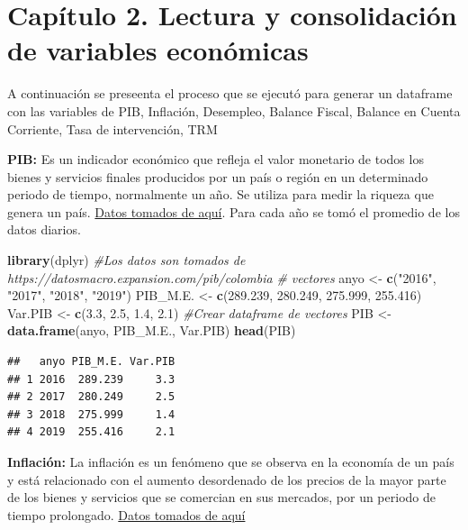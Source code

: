 \documentclass[
  11pt,
  a4paper,
]{book}
\newenvironment{Shaded}{\begin{snugshade}}{\end{snugshade}}
\newcommand{\CommentTok}[1]{\textcolor[rgb]{0.56,0.35,0.01}{\textit{#1}}}
\newcommand{\FloatTok}[1]{\textcolor[rgb]{0.00,0.00,0.81}{#1}}
\newcommand{\KeywordTok}[1]{\textcolor[rgb]{0.13,0.29,0.53}{\textbf{#1}}}
\newcommand{\NormalTok}[1]{#1}
\newcommand{\StringTok}[1]{\textcolor[rgb]{0.31,0.60,0.02}{#1}}
\begin{document}
\hypertarget{capuxedtulo-2.-lectura-y-consolidaciuxf3n-de-variables-econuxf3micas}{%
\chapter{Capítulo 2. Lectura y consolidación de variables
económicas}\label{capuxedtulo-2.-lectura-y-consolidaciuxf3n-de-variables-econuxf3micas}}

A continuación se preseenta el proceso que se ejecutó para generar un
dataframe con las variables de PIB, Inflación, Desempleo, Balance
Fiscal, Balance en Cuenta Corriente, Tasa de intervención, TRM

\textbf{PIB:} Es un indicador económico que refleja el valor monetario
de todos los bienes y servicios finales producidos por un país o región
en un determinado periodo de tiempo, normalmente un año. Se utiliza para
medir la riqueza que genera un país.
\href{https://datosmacro.expansion.com/pib/colombia}{Datos tomados de
aquí}. Para cada año se tomó el promedio de los datos diarios.

\begin{Shaded}
\begin{Highlighting}[]
\KeywordTok{library}\NormalTok{(dplyr)}
\CommentTok{#Los datos son tomados de https://datosmacro.expansion.com/pib/colombia}
\CommentTok{# vectores }
\NormalTok{anyo <-}\StringTok{ }\KeywordTok{c}\NormalTok{(}\StringTok{"2016"}\NormalTok{, }\StringTok{"2017"}\NormalTok{, }\StringTok{"2018"}\NormalTok{, }\StringTok{"2019"}\NormalTok{)}
\NormalTok{PIB_M.E. <-}\StringTok{ }\KeywordTok{c}\NormalTok{(}\FloatTok{289.239}\NormalTok{, }\FloatTok{280.249}\NormalTok{, }\FloatTok{275.999}\NormalTok{, }\FloatTok{255.416}\NormalTok{)}
\NormalTok{Var.PIB <-}\StringTok{ }\KeywordTok{c}\NormalTok{(}\FloatTok{3.3}\NormalTok{, }\FloatTok{2.5}\NormalTok{, }\FloatTok{1.4}\NormalTok{, }\FloatTok{2.1}\NormalTok{)}
\CommentTok{#Crear dataframe de vectores}
\NormalTok{PIB <-}\StringTok{ }\KeywordTok{data.frame}\NormalTok{(anyo, PIB_M.E., Var.PIB)}
\KeywordTok{head}\NormalTok{(PIB)}
\end{Highlighting}
\end{Shaded}

\begin{verbatim}
##   anyo PIB_M.E. Var.PIB
## 1 2016  289.239     3.3
## 2 2017  280.249     2.5
## 3 2018  275.999     1.4
## 4 2019  255.416     2.1
\end{verbatim}

\textbf{Inflación:} La inflación es un fenómeno que se observa en la
economía de un país y está relacionado con el aumento desordenado de los
precios de la mayor parte de los bienes y servicios que se comercian en
sus mercados, por un periodo de tiempo prolongado.
\href{https://es.wikipedia.org/wiki/Anexo:Variaci\%C3\%B3n_de_la_inflaci\%C3\%B3n_de_Colombia_desde_1946}{Datos
tomados de aquí}
\end{document}
